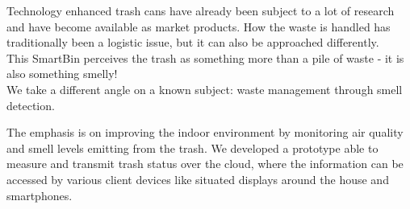 Technology enhanced trash cans have already been subject to a lot of research and have become available as market products.
How the waste is handled has traditionally been a logistic issue, but it can also be approached differently.\\
This SmartBin perceives the trash as something more than a pile of waste - it is also something smelly!\\
We take a different angle on a known subject: waste management through smell detection.

The emphasis is on improving the indoor environment by monitoring air quality and smell levels emitting from the trash.
We developed a prototype able to measure and transmit trash status over the cloud, where the information can be accessed by various client devices like situated displays around the house and smartphones.